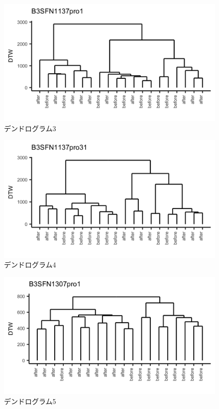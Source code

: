 \documentclass{jarticle}
\begin{document}
\begin{figure}[H]
	\begin{center}
		\includegraphics[width=15cm]{fig/dendro_3.png}
		\caption{デンドログラム3}
		\label{fig:dendro3}
	\end{center}
\end{figure}
\begin{figure}[H]
	\begin{center}
		\includegraphics[width=15cm]{fig/dendro_4.png}
		\caption{デンドログラム4}
		\label{fig:dendro4}
	\end{center}
\end{figure}
\begin{figure}[H]
	\begin{center}
		\includegraphics[width=15cm]{fig/dendro_5.png}
		\caption{デンドログラム5}
		\label{fig:dendro5}
	\end{center}
\end{figure}
\end{document}
